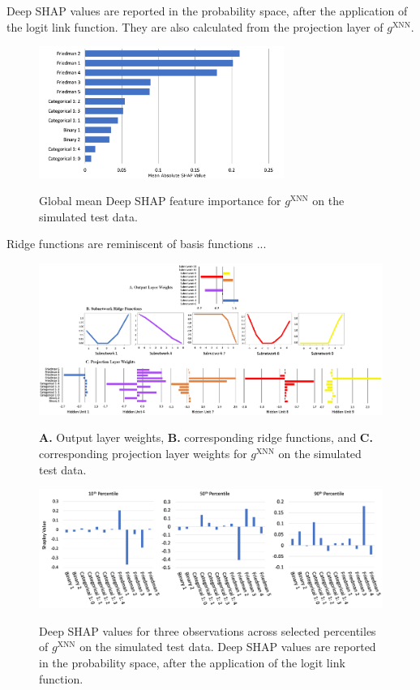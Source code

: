 \documentclass[information,article,submit,moreauthors,pdftex]{definitions/mdpi}
\begin{document}
{Deep SHAP values are reported in the probability space, after the application of the logit link function. They are also calculated from the projection layer of $g^\text{XNN}$.

\begin{figure}[H]
\centering
\includegraphics[width=8cm]{img/sim_xnn_glob.png}
\label{fig:sim_xnn_glob}
\caption{Global mean Deep SHAP feature importance for $g^\text{XNN}$ on the simulated test data.}
\end{figure} 

Ridge functions are reminiscent of basis functions ...

\begin{figure}[H]
\centering
\includegraphics[width=17cm]{img/sim_xnn_glob_ridge.png}
\label{fig:sim_xnn_glob_ridge}
\caption{\textbf{A.} Output layer weights, \textbf{B.} corresponding ridge functions, and \textbf{C.} corresponding projection layer weights for $g^\text{XNN}$ on the simulated test data.}
\end{figure}   

\begin{figure}[H]
\centering
\includegraphics[width=15cm]{img/sim_xnn_loc.png}
\label{fig:sim_xnn_loc}
\caption{Deep SHAP values for three observations across selected percentiles of  $g^\text{XNN}$ on the simulated test data. Deep SHAP values are reported in the probability space, after the application of the logit link function.}
\end{figure}  

}
\end{document}
